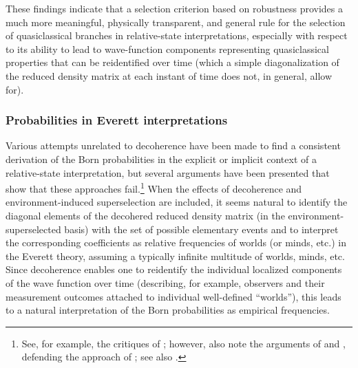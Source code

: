 \documentclass[rmp,aps,amsmath,amsfonts,noshowkeys,noshowpacs,12pt]{revtex4}
\begin{document}
These findings indicate that a selection criterion based on robustness
provides a much more meaningful, physically transparent, and general
rule for the selection of quasiclassical branches in relative-state
interpretations, especially with respect to its ability to lead to
wave-function components representing quasiclassical properties that
can be reidentified over time (which a simple diagonalization of the
reduced density matrix at each instant of time does not, in general,
allow for).


\subsubsection{Probabilities in Everett interpretations}

Various attempts unrelated to decoherence have been made to find a
consistent derivation of the Born probabilities \citep[for
instance,][]{Everett:1957:rw,Hartle:1968:gg,DeWitt:1971:pz,%
  Graham:1973:ww,Geroch:1984:yt,Deutsch:1999:tz} in the explicit or
implicit context of a relative-state interpretation, but several
arguments have been presented that show that these approaches
fail.\footnote{See, for example, the critiques of
  \citet{Stein:1984:uu,Kent:1990:nm,Squires:1990:lz,Barnum:2000:oz};
  however, also note the arguments of \citet{Wallace:2003:zr} and
  \citet{Gill:2003:tz}, defending the approach of
  \citet{Deutsch:1999:tz}; see also \citet{Saunders:2002:tz}.}  When
the effects of decoherence and environment-induced superselection are
included, it seems natural to identify the diagonal elements of the
decohered reduced density matrix (in the environment-superselected
basis) with the set of possible elementary events and to interpret the
corresponding coefficients as relative frequencies of worlds (or
minds, etc.) in the Everett theory, assuming a typically infinite
multitude of worlds, minds, etc.  Since decoherence enables one to
reidentify the individual localized components of the wave function
over time (describing, for example, observers and their measurement
outcomes attached to individual well-defined ``worlds''), this leads
to a natural interpretation of the Born probabilities as empirical
frequencies.
\end{document}
